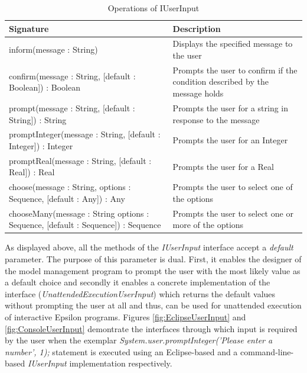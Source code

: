 \begin{longtable} {|p{5.5cm}|p{6.5cm}|}
			
			\caption{Operations of IUserInput}
			\label{tab:IUserInputOperations}\\
			
			\hline
							
			\textbf{Signature} & \textbf{Description} \\\hline

			inform(message : String) & Displays the specified message to the user\\\hline
			
			confirm(message : String, [default : Boolean]) : Boolean & Prompts the user to confirm if the condition described by the message holds \\\hline
			
			prompt(message : String, [default : String]) : String & Prompts the user for a string in response to the message \\\hline
			
			promptInteger(message : String, [default : Integer]) : Integer & Prompts the user for an Integer \\\hline
			
			promptReal(message : String, [default : Real]) : Real & Prompts the user for a Real \\\hline
			
	 		choose(message : String, options : Sequence, [default : Any]) : Any & Prompts the user to select one of the options \\\hline
			
			chooseMany(message : String options : Sequence, [default : Sequence]) : Sequence & Prompts the user to select one or more of the options \\\hline
			
\end{longtable}

As displayed above, all the methods of the \emph{IUserInput} interface accept a \emph{default} parameter. The purpose of this parameter is dual. First, it enables the designer of the model management program to prompt the user with the most likely value as a default choice and secondly it enables a concrete implementation of the interface (\emph{UnattendedExecutionUserInput}) which returns the default values without prompting the user at all and thus, can be used for unattended execution of interactive Epsilon programs. Figures \ref{fig:EclipseUserInput} and \ref{fig:ConsoleUserInput} demontrate the interfaces through which input is required by the user when the exemplar \emph{System.user.promptInteger('Please enter a number', 1);} statement is executed using  an Eclipse-based and a command-line-based \emph{IUserInput} implementation respectively.

